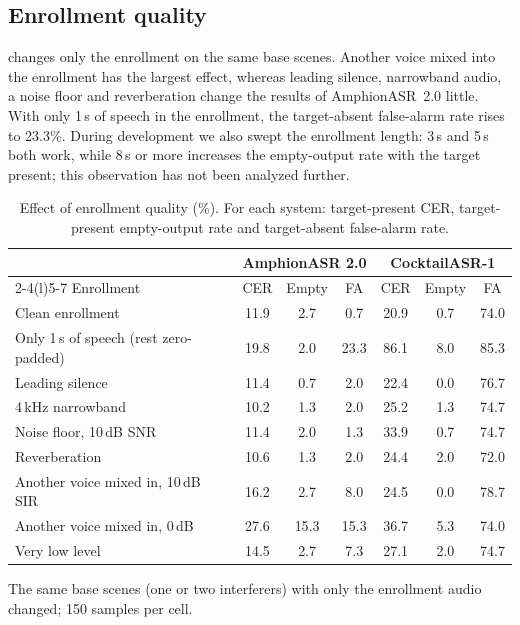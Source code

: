 \subsection{Enrollment quality}
\label{subsec:exp_enrollment}

 changes only the enrollment on the same base scenes.
Another voice mixed into the enrollment has the largest effect, whereas leading silence, narrowband audio, a noise floor and reverberation change the results of AmphionASR~2.0 little.
With only 1\,s of speech in the enrollment, the target-absent false-alarm rate rises to 23.3\%.
During development we also swept the enrollment length: 3\,s and 5\,s both work, while 8\,s or more increases the empty-output rate with the target present; this observation has not been analyzed further.

\begin{table}[t]
  \caption{Effect of enrollment quality (\%). For each system: target-present CER, target-present empty-output rate and target-absent false-alarm rate.}
  \label{tab:enrollment}
  \centering
  \small
  \begin{tabular}{@{}lcccccc@{}}
    \toprule
    & \multicolumn{3}{c}{AmphionASR 2.0} & \multicolumn{3}{c}{CocktailASR-1} \\
    \cmidrule(lr){2-4}\cmidrule(l){5-7}
    Enrollment & CER & Empty & FA & CER & Empty & FA \\
    \midrule
    Clean enrollment & 11.9 & 2.7 & 0.7 & 20.9 & 0.7 & 74.0 \\
    Only 1\,s of speech (rest zero-padded) & 19.8 & 2.0 & 23.3 & 86.1 & 8.0 & 85.3 \\
    Leading silence & 11.4 & 0.7 & 2.0 & 22.4 & 0.0 & 76.7 \\
    4\,kHz narrowband & 10.2 & 1.3 & 2.0 & 25.2 & 1.3 & 74.7 \\
    Noise floor, 10\,dB SNR & 11.4 & 2.0 & 1.3 & 33.9 & 0.7 & 74.7 \\
    Reverberation & 10.6 & 1.3 & 2.0 & 24.4 & 2.0 & 72.0 \\
    Another voice mixed in, 10\,dB SIR & 16.2 & 2.7 & 8.0 & 24.5 & 0.0 & 78.7 \\
    Another voice mixed in, 0\,dB & 27.6 & 15.3 & 15.3 & 36.7 & 5.3 & 74.0 \\
    Very low level & 14.5 & 2.7 & 7.3 & 27.1 & 2.0 & 74.7 \\
    \bottomrule
  \end{tabular}
  \par\smallskip
  {\footnotesize The same base scenes (one or two interferers) with only the enrollment audio changed; 150 samples per cell.\par}
\end{table}

